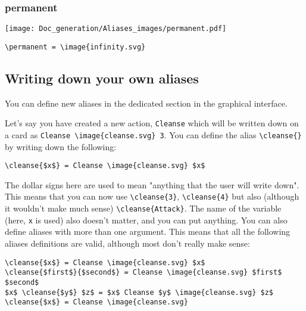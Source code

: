 \documentclass{article}
\begin{document}
\subsubsection{permanent}
\begin{minipage}{0.45\linewidth}
\raggedright
\begin{spverbatim}
\permanent
\end{spverbatim}
\end{minipage}
\begin{minipage}{0.45\linewidth}
\raggedleft
\texttt{[image: Doc\_generation/Aliases\_images/permanent.pdf]}
\end{minipage}
\begin{center}
\begin{BVerbatim}
\permanent = \image{infinity.svg}
\end{BVerbatim}
\end{center}




\subsection{Writing down your own aliases}
You can define new aliases in the dedicated section in the graphical interface.

Let's say you have created a new action, \verb`Cleanse` which will be written down on a card as \verb`Cleanse \image{cleanse.svg} 3`. You can define the alias \verb`\cleanse{}` by writing down the following:

\begin{center}
\begin{BVerbatim}
\cleanse{$x$} = Cleanse \image{cleanse.svg} $x$
\end{BVerbatim}
\end{center}

The dollar signs here are used to mean "anything that the user will write down". This means that you can now use \verb`\cleanse{3}`, \verb`\cleanse{4}` but also (although it wouldn't make much sense) \verb`\cleanse{Attack}`. The name of the variable (here, \verb`x` is used) also doesn't matter, and you can put anything. You can also define aliases with more than one argument. This means that all the following aliases definitions are valid, although most don't really make sense:

\begin{center}
\begin{BVerbatim}
\cleanse{$x$} = Cleanse \image{cleanse.svg} $x$
\cleanse{$first$}{$second$} = Cleanse \image{cleanse.svg} $first$ $second$
$x$ \cleanse{$y$} $z$ = $x$ Cleanse $y$ \image{cleanse.svg} $z$
\cleanse{$x$} = Cleanse \image{cleanse.svg}
\end{BVerbatim}
\end{center}
\end{document}
